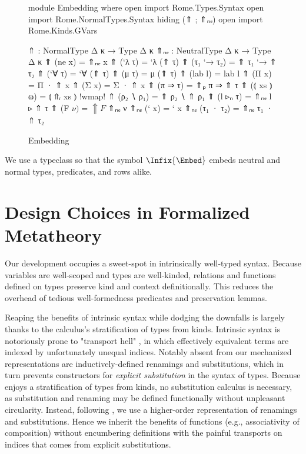 \begin{figure}
\begin{AgdaAlign}
\begin{code}[hide]
module Embedding where
  open import Rome.Types.Syntax 
  open import Rome.NormalTypes.Syntax hiding (⇑ ; ⇑ₙₑ)
  open import Rome.Kinds.GVars
\end{code}
\begin{code}
  ⇑   : NormalType Δ κ  → Type Δ κ
  ⇑ₙₑ : NeutralType Δ κ → Type Δ κ
  ⇑ (ne x)      = ⇑ₙₑ x
  ⇑ (`λ τ)      = `λ (⇑ τ)
  ⇑ (τ₁ `→ τ₂) = ⇑ τ₁ `→ ⇑ τ₂
  ⇑ (`∀ τ)      = `∀ (⇑ τ)
  ⇑ (μ τ)    = μ (⇑ τ)
  ⇑  (lab l)    = lab l
  ⇑  (Π x)      = Π · ⇑ x
  ⇑  (Σ x)      = Σ · ⇑ x
  ⇑  (π ⇒ τ)   = ⇑ₚ π ⇒ ⇑ τ
  ⇑  (⦅ xs ⦆ ω)  = ⦅ ⇑ᵣ xs ⦆ {!wmap!}
  ⇑  (ρ₂ ∖ ρ₁)  = ⇑ ρ₂ ∖ ⇑ ρ₁
  ⇑  (l ▹ₙ τ)   = ⇑ₙₑ l ▹ ⇑ τ
  ⇑  (F $ ν)  = ⇑ F $ ⇑ₙₑ ν
  ⇑ₙₑ (` x)     = ` x
  ⇑ₙₑ (τ₁ · τ₂) = ⇑ₙₑ τ₁ · ⇑ τ₂
\end{code}
\end{AgdaAlign}
\caption{Embedding}
\label{fig:embedding}
\end{figure}

\Ni We use a typeclass so that the symbol $\Infix{\Embed}$ embeds neutral and normal types, predicates, and rows alike.


\section{Design Choices in Formalized Metatheory}

Our development occupies a sweet-spot in intrinsically well-typed syntax. Because variables are well-scoped and types are well-kinded, relations and functions defined on types preserve kind and context definitionally. This reduces the overhead of tedious well-formedness predicates and preservation lemmas. 

Reaping the benefits of intrinsic syntax while dodging the downfalls is largely thanks to the \Rome{} calculus's stratification of types from kinds. Intrinsic syntax is notoriously prone to "transport hell" \citep{SaffrichTM24, ChenNFT26}, in which effectively equivalent terms are indexed by unfortunately unequal indices. Notably absent from our mechanized representations are inductively-defined renamings and substitutions, which in turn prevents constructors for \emph{explicit substitution} in the syntax of types. Because \Rome{} enjoys a stratification of types from kinds, no substitution calculus is necessary, as substitution and renaming may be defined functionally without unpleasant circularity. Instead, following \citet{ChapmanKNW19}, we use a higher-order representation of renamings and substitutions. Hence we inherit the benefits of functions (e.g., associativity of composition) without encumbering definitions with the painful transports on indices that comes from explicit substitutions.

